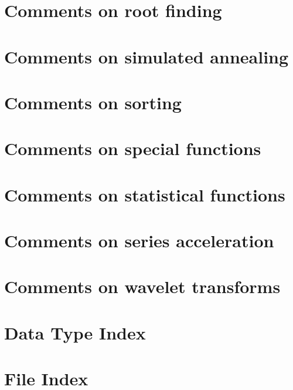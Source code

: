 \documentclass{book}
\begin{document}
\chapter{Comments on root finding}
\label{Comments on root finding}
\hypertarget{Comments on root finding}{}

\chapter{Comments on simulated annealing}
\label{Comments on simulated annealing}
\hypertarget{Comments on simulated annealing}{}

\chapter{Comments on sorting}
\label{Comments on sorting}
\hypertarget{Comments on sorting}{}

\chapter{Comments on special functions}
\label{Comments on special functions}
\hypertarget{Comments on special functions}{}

\chapter{Comments on statistical functions}
\label{Comments on statistical functions}
\hypertarget{Comments on statistical functions}{}

\chapter{Comments on series acceleration}
\label{Comments on series acceleration}
\hypertarget{Comments on series acceleration}{}

\chapter{Comments on wavelet transforms}
\label{Comments on wavelet transforms}
\hypertarget{Comments on wavelet transforms}{}

\chapter{Data Type Index}

\chapter{File Index}

\end{document}
